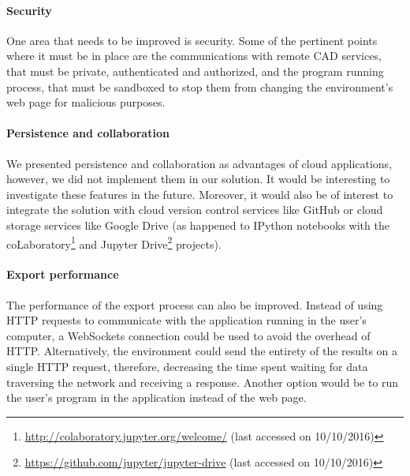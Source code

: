 \paragraph{Security}
One area that needs to be improved is security.
Some of the pertinent points where it must be in place are the communications with remote CAD services, that must be private, authenticated and authorized, and the program running process, that must be sandboxed to stop them from changing the environment's web page for malicious purposes.

\paragraph{Persistence and collaboration}
We presented persistence and collaboration as advantages of cloud applications, however, we did not implement them in our solution.
It would be interesting to investigate these features in the future.
Moreover, it would also be of interest to integrate the solution with cloud version control services like GitHub or cloud storage services like Google Drive (as happened to IPython notebooks with the coLaboratory\footnote{\url{http://colaboratory.jupyter.org/welcome/} (last accessed on 10/10/2016)} and Jupyter Drive\footnote{\url{https://github.com/jupyter/jupyter-drive} (last accessed on 10/10/2016)} projects).

\paragraph{Export performance}
The performance of the export process can also be improved.
Instead of using HTTP requests to communicate with the application running in the user's computer, a WebSockets connection\cite{rfc6455} could be used to avoid the overhead of HTTP.
Alternatively, the environment could send the entirety of the results on a single HTTP request, therefore, decreasing the time spent waiting for data traversing the network and receiving a response.
Another option would be to run the user's program in the application instead of the web page.









